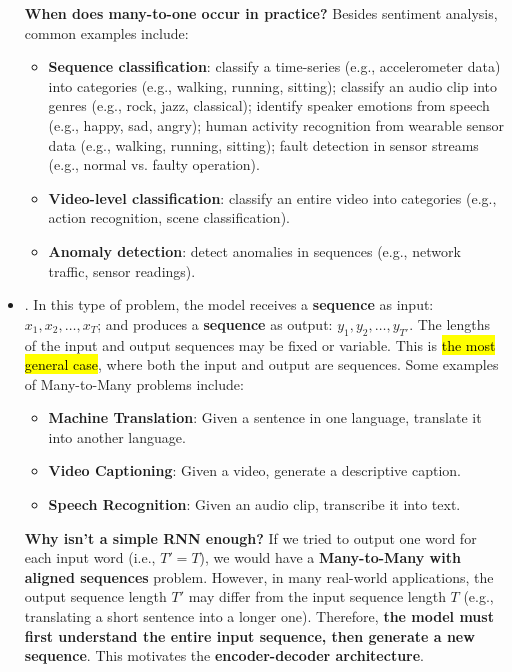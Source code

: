 \begin{itemize}
    \textcolor{Green3}{ \textbf{When does many-to-one occur in practice?}} Besides sentiment analysis, common examples include:
    \begin{itemize}
        \item \textbf{Sequence classification}: classify a time-series (e.g., accelerometer data) into categories (e.g., walking, running, sitting); classify an audio clip into genres (e.g., rock, jazz, classical); identify speaker emotions from speech (e.g., happy, sad, angry); human activity recognition from wearable sensor data (e.g., walking, running, sitting); fault detection in sensor streams (e.g., normal vs. faulty operation).
        \item \textbf{Video-level classification}: classify an entire video into categories (e.g., action recognition, scene classification).
        \item \textbf{Anomaly detection}: detect anomalies in sequences (e.g., network traffic, sensor readings).
    \end{itemize}


    \item[\textcolor{Red3}{\faIcon{book}}] . In this type of problem, the model receives a \textbf{sequence} as input: $x_1, x_2, \ldots, x_T$; and produces a \textbf{sequence} as output: $y_1, y_2, \ldots, y_{T'}$. The lengths of the input and output sequences may be fixed or variable. This is \hl{the most general case}, where both the input and output are sequences. Some examples of Many-to-Many problems include:
    \begin{itemize}
        \item \textbf{Machine Translation}: Given a sentence in one language, translate it into another language.
        \item \textbf{Video Captioning}: Given a video, generate a descriptive caption.
        \item \textbf{Speech Recognition}: Given an audio clip, transcribe it into text.
    \end{itemize}
    \textcolor{Green3}{ \textbf{Why isn't a simple RNN enough?}} If we tried to output one word for each input word (i.e., $T' = T$), we would have a \textbf{Many-to-Many with aligned sequences} problem. However, in many real-world applications, the output sequence length $T'$ may differ from the input sequence length $T$ (e.g., translating a short sentence into a longer one). Therefore, \textbf{the model must first understand the entire input sequence, then generate a new sequence}. This motivates the \textbf{encoder-decoder architecture}.


\end{itemize}
